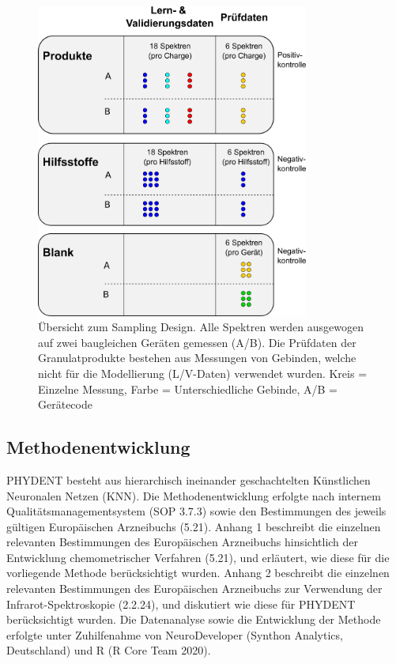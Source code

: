 \documentclass[11pt, a4paper]{article}
\begin{document}
\begin{figure}[h]
\begin{center}
\includegraphics[width=0.8\textwidth]{sampling_design.png}
\end{center}
\caption{Übersicht zum Sampling Design. Alle Spektren werden ausgewogen auf zwei baugleichen Geräten gemessen (A/B). Die Prüfdaten der Granulatprodukte bestehen aus Messungen von Gebinden, welche nicht für die Modellierung (L/V-Daten) verwendet wurden.
Kreis = Einzelne Messung, Farbe = Unterschiedliche Gebinde, A/B = Gerätecode
}
\label{fig:Sampling_Design}
\end{figure}

\subsection{Methodenentwicklung}
PHYDENT besteht aus hierarchisch ineinander geschachtelten Künstlichen Neuronalen Netzen  (KNN). Die Methodenentwicklung erfolgte nach internem Qualitätsmanagementsystem (SOP 3.7.3) sowie den Bestimmungen des jeweils gültigen Europäischen Arzneibuchs (5.21). Anhang 1 beschreibt die einzelnen relevanten Bestimmungen des Europäischen Arzneibuchs hinsichtlich der Entwicklung chemometrischer Verfahren (5.21), und erläutert, wie diese für die vorliegende Methode berücksichtigt wurden. Anhang 2 beschreibt die einzelnen relevanten Bestimmungen des Europäischen Arzneibuchs zur Verwendung der Infrarot-Spektroskopie (2.2.24), und diskutiert wie diese für PHYDENT berücksichtigt wurden. Die Datenanalyse sowie die Entwicklung der Methode erfolgte unter Zuhilfenahme von NeuroDeveloper (Synthon Analytics, Deutschland) und R (R Core Team 2020).
\end{document}

